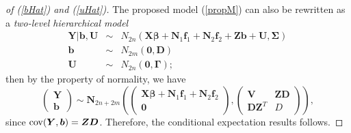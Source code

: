\documentclass[article,lineno]{biometrika}
\begin{document}
\begin{proof} [of (\ref{bHat}) and  (\ref{uHat})]
The proposed model (\ref{propM}) can also be rewritten as a {\it two-level hierarchical model}
\begin{eqnarray*}
\boldsymbol Y| \boldsymbol b, \boldsymbol U 
&\sim&
N_{2n} \left(\boldsymbol{X}\boldsymbol{\beta} +
 \boldsymbol N_{1} \boldsymbol f_1 + 
  \boldsymbol N_{2} \boldsymbol f_2 + 
\boldsymbol{Z}\boldsymbol{b} + \boldsymbol U,  
\boldsymbol \Sigma \right)
\\ 
\boldsymbol b &\sim& N_{2m} (\boldsymbol 0, \boldsymbol D)   
\\
\boldsymbol U &\sim& N_{2n} (\boldsymbol 0, \boldsymbol \Gamma); \nonumber
\end{eqnarray*}
then by the property of normality, we have 
 \[
 \begin{pmatrix}
  \boldsymbol Y \\
  \boldsymbol b
 \end{pmatrix}
 \sim 
 \boldsymbol N_{2n + 2m} 
 \left(
 \begin{pmatrix}
 \boldsymbol{X}\boldsymbol{\beta} + \boldsymbol N_{1} \boldsymbol f_1 +  \boldsymbol N_{2} \boldsymbol f_2 \\
\boldsymbol 0
 \end{pmatrix},
  \begin{pmatrix}
  \boldsymbol V &  \boldsymbol Z\boldsymbol D \\
  \boldsymbol D\boldsymbol Z^T & D 
 \end{pmatrix}
 \right),
\]
since ${\rm cov} (\bm Y, \bm b) = \bm Z \bm D$.
Therefore, the conditional expectation results follows.
\end{proof}
\end{document}
